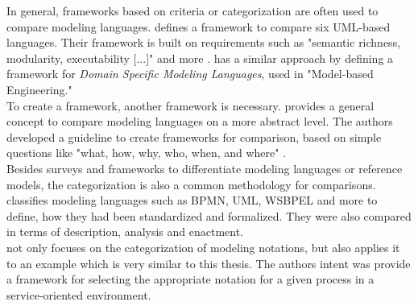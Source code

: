 In general, frameworks based on criteria or categorization are often used to compare modeling languages. \cite{BendraouJezequelGervaisEtAl2010} defines a framework to compare six UML-based languages. Their framework is built on requirements such as "semantic richness, modularity, executability [...]" and more \cite{BendraouJezequelGervaisEtAl2010}. \cite{Vallecillo2010} has a similar approach by defining a framework for \textit{Domain Specific Modeling Languages}, used in "Model-based Engineering." \\
To create a framework, another framework is necessary. \cite{SoederstroemAnderssonJohannessonEtAl2002} provides a general concept to compare modeling languages on a more abstract level. The authors developed a guideline to create frameworks for comparison, based on simple questions like "what, how, why, who, when, and where" \cite{SoederstroemAnderssonJohannessonEtAl2002}. \\
Besides surveys and frameworks to differentiate modeling languages or reference models, the categorization is also a common methodology for comparisons. \cite{MiliTremblayJaoudeEtAl2010} classifies modeling languages such as BPMN, UML, \ac{WSBPEL} and more to define, how they had been standardized and formalized. They were also compared in terms of description, analysis and enactment. \\
\cite{RoserBauer2005} not only focuses on the categorization of modeling notations, but also applies it to an example which is very similar to this thesis. The authors intent was provide a framework for selecting the appropriate notation for a given process in a service-oriented environment. 
